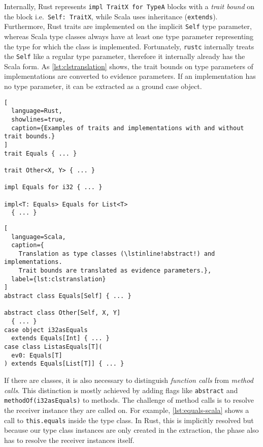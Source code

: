 Internally, Rust represents
\passthrough{\lstinline!impl TraitX for TypeA!} blocks with a
\emph{trait bound} on the block
i.e.~\passthrough{\lstinline!Self: TraitX!}, while Scala uses
inheritance (\passthrough{\lstinline!extends!}). Furthermore, Rust
traits are implemented on the implicit \passthrough{\lstinline!Self!}
type parameter, whereas Scala type classes always have at least one type
parameter representing the type for which the class is implemented.
Fortunately, \passthrough{\lstinline!rustc!} internally treats the
\passthrough{\lstinline!Self!} like a regular type parameter, therefore
it internally already has the Scala form. As \autoref{lst:clstranslation}
shows, the trait bounds on type parameters of implementations are
converted to evidence parameters. If an implementation has no type
parameter, it can be extracted as a ground case object.

\noindent
\begin{minipage}[t]{.49\textwidth}
\begin{lstlisting}[
  language=Rust,
  showlines=true,
  caption={Examples of traits and implementations with and without trait bounds.}
]
trait Equals { ... }

trait Other<X, Y> { ... }

impl Equals for i32 { ... }

impl<T: Equals> Equals for List<T>
  { ... }

\end{lstlisting}
\end{minipage}\hfill
\begin{minipage}[t]{.49\textwidth}
\begin{lstlisting}[
  language=Scala,
  caption={
    Translation as type classes (\lstinline!abstract!) and implementations.
    Trait bounds are translated as evidence parameters.},
  label={lst:clstranslation}
]
abstract class Equals[Self] { ... }

abstract class Other[Self, X, Y]
  { ... }
case object i32asEquals
  extends Equals[Int] { ... }
case class ListasEquals[T](
  ev0: Equals[T]
) extends Equals[List[T]] { ... }
\end{lstlisting}
\end{minipage}

If there are classes, it is also necessary to distinguish \emph{function
calls} from \emph{method calls}. This distinction is mostly achieved by
adding flags like \passthrough{\lstinline!abstract!} and
\passthrough{\lstinline!methodOf(i32asEquals)!} to methods. The
challenge of method calls is to resolve the receiver instance they are
called on. For example, \autoref{lst:equals-scala} shows a call to
\passthrough{\lstinline!this.equals!} inside the type class. In Rust,
this is implicitly resolved but because our type class instances are
only created in the extraction, the phase also has to resolve the
receiver instances itself.

